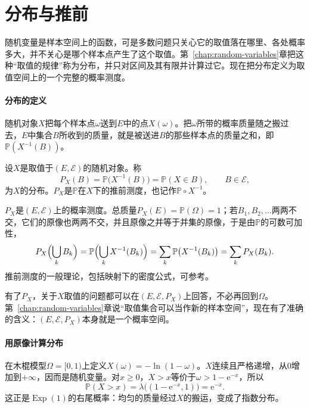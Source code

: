 \section{分布与推前}
\label{sec:pspace-distributions}

随机变量是样本空间上的函数，可是多数问题只关心它的取值落在哪里、各处概率多大，并不关心是哪个样本点产生了这个取值。第~\ref{chap:random-variables}章把这种“取值的规律”称为分布，并只对区间及其有限并计算过它。现在把分布定义为取值空间上的一个完整的概率测度。

\paragraph{分布的定义}
随机对象$X$把每个样本点$\omega$送到$E$中的点$X(\omega)$。把$\omega$所带的概率质量随之搬过去，$E$中集合$B$所收到的质量，就是被送进$B$的那些样本点的质量之和，即$\mathbb{P}(X^{-1}(B))$。

\begin{definition}[分布]
\label{def:pspace-distribution}
设$X$是取值于$(E,\mathcal{E})$的随机对象。称
\begin{equation}
  P_X(B)=\mathbb{P}\bigl(X^{-1}(B)\bigr)=\mathbb{P}(X\in B),\qquad B\in\mathcal{E},
  \label{eq:pspace-distribution}
\end{equation}
为$X$的分布。$P_X$是$\mathbb{P}$在$X$下的推前测度，也记作$\mathbb{P}\circ X^{-1}$。
\end{definition}

$P_X$是$(E,\mathcal{E})$上的概率测度。总质量$P_X(E)=\mathbb{P}(\Omega)=1$；若$B_1,B_2,\dots$两两不交，它们的原像也两两不交，并且原像之并等于并集的原像，于是由$\mathbb{P}$的可数可加性，
\[
  P_X\Bigl(\bigcup_kB_k\Bigr)=\mathbb{P}\Bigl(\bigcup_kX^{-1}(B_k)\Bigr)=\sum_k\mathbb{P}\bigl(X^{-1}(B_k)\bigr)=\sum_kP_X(B_k).
\]
推前测度的一般理论，包括映射下的密度公式，可参考。

有了$P_X$，关于$X$取值的问题都可以在$(E,\mathcal{E},P_X)$上回答，不必再回到$\Omega$。第~\ref{chap:random-variables}章说“取值集合可以当作新的样本空间”，现在有了准确的含义：$(E,\mathcal{E},P_X)$本身就是一个概率空间。

\paragraph{用原像计算分布}
在木棍模型$\Omega=[0,1)$上定义$X(\omega)=-\ln(1-\omega)$。$X$连续且严格递增，从$0$增加到$+\infty$，因而是随机变量。对$x\geq0$，$X>x$等价于$\omega>1-\mathrm{e}^{-x}$，所以
\[
  \mathbb{P}(X>x)=\lambda\bigl((1-\mathrm{e}^{-x},1)\bigr)=\mathrm{e}^{-x}.
\]
这正是$\operatorname{Exp}(1)$的右尾概率：均匀的质量经过$X$的搬运，变成了指数分布。

